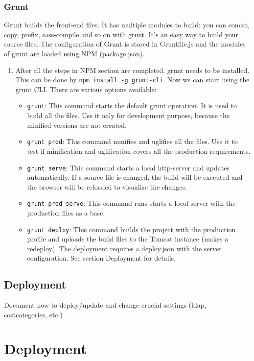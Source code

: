 \subsubsection{Grunt}
Grunt builds the front-end files. It has multiple modules to build: you can concat, copy, prefix, sass-compile and so on with grunt. It’s an easy way to build your source files. The configuration of Grunt is stored in Gruntfile.js and the modules of grunt are loaded using NPM (package.json).
\begin{enumerate}
  \item After all the steps in NPM section are completed, grunt needs to be installed. This can be done by \texttt{npm install -g grunt-cli}. Now we can start using the grunt CLI. There are various options available:
  \begin{itemize}
      \item \texttt{grunt}: This command starts the default grunt operation. It is used to build all the files. Use it only for development purpose, because the minified versions are not created.
      \item \texttt{grunt prod}: This command minifies and uglifies all the files. Use it to test if minification and uglification covers all the production requirements.
      \item \texttt{grunt serve}: This command starts a local http-server and updates automatically. If a source file is changed, the build will be executed and the browser will be reloaded to visualize the changes.
      \item \texttt{grunt prod-serve}: This command runs starts a local server with the production files as a base.
      \item \texttt{grunt deploy}: This command builds the project with the production profile and uploads the build files to the Tomcat instance (makes a redeploy). The deployment requires a deploy.json with the server configuration. See section Deployment for details.
    \end{itemize}
\end{enumerate}

\subsection{Deployment}

Document how to deploy/update and change crucial settings (ldap, costcategories, etc.)

\section{Deployment}

